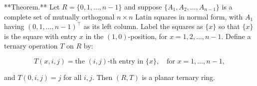 **Theorem.** Let $R = \{0, 1, \dots, n-1\}$ and suppose $\{A_1, A_2, \dots, A_{n-1}\}$ is a complete set of mutually orthogonal $n \times n$ Latin squares in normal form, with $A_1$ having $(0, 1, \dots, n-1)^\top$ as its left column. Label the squares as $\{x\}$ so that $\{x\}$ is the square with entry $x$ in the $(1,0)$-position, for $x = 1, 2, \dots, n-1$. Define a ternary operation $T$ on $R$ by:

$$T(x, i, j) = \text{the }(i,j)\text{-th entry in }\{x\}, \quad \text{for } x = 1, \dots, n-1,$$

and $T(0, i, j) = j$ for all $i, j$. Then $(R, T)$ is a planar ternary ring.
